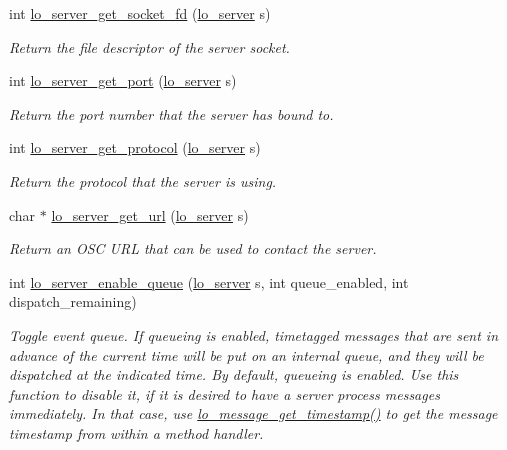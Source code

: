 \begin{DoxyCompactItemize}
int \hyperlink{group__liblolowlevel_gae11ca5a5b4ec2943d5a04642ba5052ae}{lo\+\_\+server\+\_\+get\+\_\+socket\+\_\+fd} (\hyperlink{lo__types_8h_a59067bf50cf8abb4371da6f03c9036c9}{lo\+\_\+server} s)
\begin{DoxyCompactList}\small\item\em Return the file descriptor of the server socket. \end{DoxyCompactList}\item 
int \hyperlink{group__liblolowlevel_ga532ef6e1b8675b23e65dd19eeb648c1d}{lo\+\_\+server\+\_\+get\+\_\+port} (\hyperlink{lo__types_8h_a59067bf50cf8abb4371da6f03c9036c9}{lo\+\_\+server} s)
\begin{DoxyCompactList}\small\item\em Return the port number that the server has bound to. \end{DoxyCompactList}\item 
int \hyperlink{group__liblolowlevel_gab40a599fe8440512b18479dac333e89f}{lo\+\_\+server\+\_\+get\+\_\+protocol} (\hyperlink{lo__types_8h_a59067bf50cf8abb4371da6f03c9036c9}{lo\+\_\+server} s)
\begin{DoxyCompactList}\small\item\em Return the protocol that the server is using. \end{DoxyCompactList}\item 
char $\ast$ \hyperlink{group__liblolowlevel_ga33df48c641833d330a8ba6704caf4977}{lo\+\_\+server\+\_\+get\+\_\+url} (\hyperlink{lo__types_8h_a59067bf50cf8abb4371da6f03c9036c9}{lo\+\_\+server} s)
\begin{DoxyCompactList}\small\item\em Return an O\+S\+C U\+R\+L that can be used to contact the server. \end{DoxyCompactList}\item 
int \hyperlink{group__liblolowlevel_ga3e23b9b6027042e136f344d001431ac6}{lo\+\_\+server\+\_\+enable\+\_\+queue} (\hyperlink{lo__types_8h_a59067bf50cf8abb4371da6f03c9036c9}{lo\+\_\+server} s, int queue\+\_\+enabled, int dispatch\+\_\+remaining)
\begin{DoxyCompactList}\small\item\em Toggle event queue. If queueing is enabled, timetagged messages that are sent in advance of the current time will be put on an internal queue, and they will be dispatched at the indicated time. By default, queueing is enabled. Use this function to disable it, if it is desired to have a server process messages immediately. In that case, use \hyperlink{group__liblolowlevel_ga164e068064afa94454eb6515b9b1748d}{lo\+\_\+message\+\_\+get\+\_\+timestamp()} to get the message timestamp from within a method handler. \end{DoxyCompactList}\item 

\end{DoxyCompactItemize}
